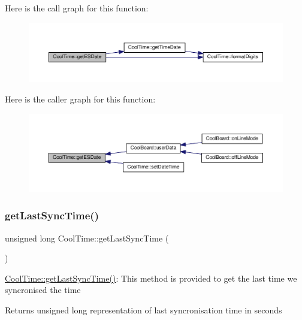 Here is the call graph for this function\+:
\nopagebreak
\begin{figure}[H]
\begin{center}
\leavevmode
\includegraphics[width=350pt]{class_cool_time_ac4f32ee513c1328d984306645e8785a4_cgraph}
\end{center}
\end{figure}
Here is the caller graph for this function\+:
\nopagebreak
\begin{figure}[H]
\begin{center}
\leavevmode
\includegraphics[width=350pt]{class_cool_time_ac4f32ee513c1328d984306645e8785a4_icgraph}
\end{center}
\end{figure}
\mbox{\label{class_cool_time_a5d17f707a9d337720493b2bce9d41c21}} 
\subsubsection{\texorpdfstring{get\+Last\+Sync\+Time()}{getLastSyncTime()}}
{\footnotesize\ttfamily unsigned long Cool\+Time\+::get\+Last\+Sync\+Time (\begin{DoxyParamCaption}{ }\end{DoxyParamCaption})}

\hyperlink{class_cool_time_a5d17f707a9d337720493b2bce9d41c21}{Cool\+Time\+::get\+Last\+Sync\+Time()}\+: This method is provided to get the last time we syncronised the time

\begin{DoxyReturn}{Returns}
unsigned long representation of last syncronisation time in seconds 
\end{DoxyReturn}


